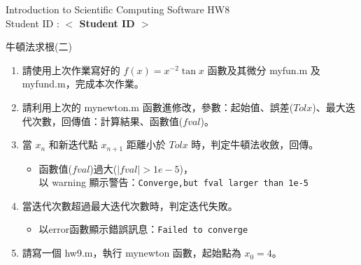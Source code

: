 \documentclass[12pt,a4paper]{article}
\newcommand{\placeholder}[1]{\textbf{$<$ #1 $>$}}
\newcommand{\idnumber}{\placeholder{Student ID}}
\begin{document}
\begin{CJK}{UTF8}{bsmi}
\begin{flushleft}Introduction to Scientific Computing Software HW8
\\Student ID : \idnumber{}\end{flushleft}

牛頓法求根(二)
\begin{enumerate}
\item 請使用上次作業寫好的 $f(x)=x^{-2}\tan x$ 函數及其微分 myfun.m 及 myfund.m，完成本次作業。
\item 請利用上次的 mynewton.m 函數進修改，參數：起始值、誤差($Tolx$)、最大迭代次數，回傳值：計算結果、函數值($fval$)。
\item 當 $x_n$ 和新迭代點 $x_{n+1}$ 距離小於 $Tolx$ 時，判定牛頓法收斂，回傳。
\begin{itemize}
\item 函數值($fval$)過大($|fval|>1e-5$)，\\以 warning 顯示警告：\texttt{Converge,but fval larger than 1e-5}
\end{itemize}
\item 當迭代次數超過最大迭代次數時，判定迭代失敗。
\begin{itemize}
\item 以error函數顯示錯誤訊息：\texttt{Failed to converge}
\end{itemize}
\item 請寫一個 hw9.m，執行 mynewton 函數，起始點為 $x_0=4$。

\end{enumerate}
\end{CJK}
\end{document}
